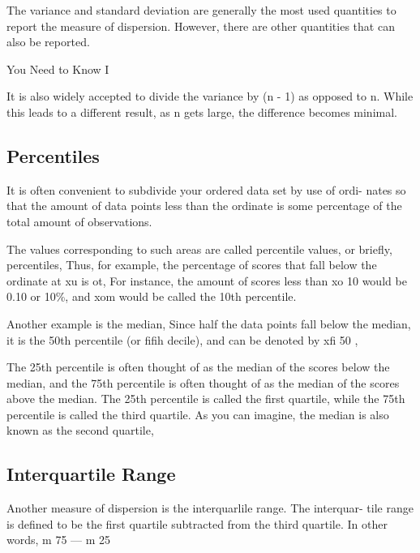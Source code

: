 The variance and standard deviation are generally the most used quantities to report the measure of dispersion. However, there are other quantities that can also be reported.

You Need to Know I

It is also widely accepted to divide the variance by (n - 1) as opposed to n. While this leads to a different result, as
n gets large, the difference becomes minimal.


\subsection*{Percentiles}
It is often convenient to subdivide your ordered data set by use of ordi-
nates so that the amount of data points less than the ordinate is some
percentage of the total amount of observations. 

The values corresponding to such areas are called percentile values, or brieﬂy, percentiles,
Thus, for example, the percentage of scores that fall below the ordinate
at xu is ot, For instance, the amount of scores less than xo 10 would be
0.10 or 10\%, and xom would be called the 10th percentile. 

Another example is the median, Since half the data points fall below the median, it is the 50th percentile (or ﬁﬁh decile), and can be denoted by xﬁ 50 ,

The 25th percentile is often thought of as the median of the scores below the median, and the 75th percentile is often thought of as the median of the scores above the median. The 25th percentile is called the first quartile, while the 75th percentile is called the third quartile. As you can imagine, the median is also known as the second quartile,
\subsection*{Interquartile Range}
Another measure of dispersion is the interquarlile range. The interquar-
tile range is deﬁned to be the ﬁrst quartile subtracted from the third
quartile. In other words, m 75 — m 25

